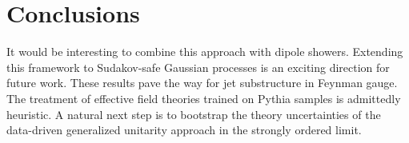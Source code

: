 \section{Conclusions}\label{sec:conclusions}

It would be interesting to combine this approach with dipole showers.
Extending this framework to Sudakov-safe Gaussian processes is an
exciting direction for future work. These results pave the way for jet
substructure in Feynman gauge. The treatment of effective field theories
trained on Pythia samples is admittedly heuristic. A natural next step
is to bootstrap the theory uncertainties of the data-driven generalized
unitarity approach in the strongly ordered limit.

